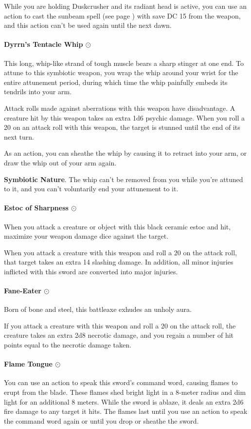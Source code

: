         While you are holding Duskcrusher and its radiant head is active, you can use an action to cast the sunbeam spell (see page \pageref{spell::sunbeam}) with save DC 15 from the weapon, and this action can't be used again until the next dawn.
    \paragraph{Dyrrn's Tentacle Whip $\odot$}
        This long, whip-like strand of tough muscle bears a sharp stinger at one end.
        To attune to this symbiotic weapon, you wrap the whip around your wrist for the entire attunement period, during which time the whip painfully embeds its tendrils into your arm.

        Attack rolls made against aberrations with this weapon have disadvantage.
        A creature hit by this weapon takes an extra 1d6 psychic damage.
        When you roll a 20 on an attack roll with this weapon, the target is stunned until the end of its next turn.

        As an action, you can sheathe the whip by causing it to retract into your arm, or draw the whip out of your arm again.

        \textbf{Symbiotic Nature}.
        The whip can't be removed from you while you're attuned to it, and you can't voluntarily end your attunement to it.
    \paragraph{Estoc of Sharpness $\odot$}
        When you attack a creature or object with this black ceramic estoc and hit, maximize your weapon damage dice against the target.

        When you attack a creature with this weapon and roll a 20 on the attack roll, that target takes an extra 14 slashing damage.
        In addition, all minor injuries inflicted with this sword are converted into major injuries.
    \paragraph{Fane-Eater $\odot$}
        Born of bone and steel, this battleaxe exhudes an unholy aura.

        If you attack a creature with this weapon and roll a 20 on the attack roll, the creature takes an extra 2d8 necrotic damage, and you regain a number of hit points equal to the necrotic damage taken.
    \paragraph{Flame Tongue $\odot$}
        You can use an action to speak this sword's command word, causing flames to erupt from the blade.
        These flames shed bright light in a 8-meter radius and dim light for an additional 8 meters.
        While the sword is ablaze, it deals an extra 2d6 fire damage to any target it hits.
        The flames last until you use an action to speak the command word again or until you drop or sheathe the sword.
